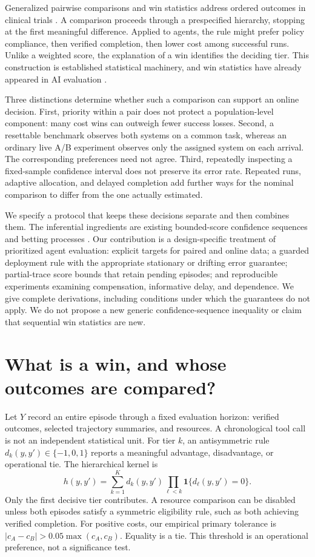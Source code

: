 \documentclass[11pt,letterpaper]{article}
\newcommand{\ind}{\mathbf 1}
\begin{document}
Generalized pairwise comparisons and win statistics address ordered
outcomes in clinical trials \citep{buyse2010generalized,pocock2012win}.
A comparison proceeds through a prespecified hierarchy, stopping at the
first meaningful difference. Applied to agents, the rule might prefer
policy compliance, then verified completion, then lower cost among
successful runs. Unlike a weighted score, the explanation of a win
identifies the deciding tier. This construction is established statistical
machinery, and win statistics have already appeared in AI evaluation
\citep{realpocqi2026}.

Three distinctions determine whether such a comparison can support an
online decision. First, priority within a pair does not protect a
population-level component: many cost wins can outweigh fewer success
losses. Second, a resettable benchmark observes both systems on a common
task, whereas an ordinary live A/B experiment observes only the assigned
system on each arrival. The corresponding preferences need not agree.
Third, repeatedly inspecting a fixed-sample confidence interval does not
preserve its error rate. Repeated runs, adaptive allocation, and delayed
completion add further ways for the nominal comparison to differ from the
one actually estimated.

We specify a protocol that keeps these decisions separate and then
combines them. The inferential ingredients are existing bounded-score
confidence sequences and betting processes
\citep{howard2021confidence,waudbysmith2024betting}. Our contribution is a
design-specific treatment of prioritized agent evaluation: explicit
targets for paired and online data; a guarded deployment rule with the
appropriate stationary or drifting error guarantee; partial-trace score bounds that retain pending episodes; and reproducible
experiments examining compensation, informative delay, and dependence. We give
complete derivations, including conditions under which the guarantees do
not apply. We do not propose a new generic confidence-sequence inequality
or claim that sequential win statistics are new.

\section{What is a win, and whose outcomes are compared?}
\label{sec:estimands}
Let $Y$ record an entire episode through a fixed evaluation horizon:
verified outcomes, selected trajectory summaries, and resources. A
chronological tool call is not an independent statistical unit. For tier
$k$, an antisymmetric rule $d_k(y,y')\in\{-1,0,1\}$ reports a meaningful
advantage, disadvantage, or operational tie. The hierarchical kernel is
\begin{equation}
 h(y,y')=\sum_{k=1}^{K}d_k(y,y')\prod_{\ell<k}
             \ind\{d_\ell(y,y')=0\}.
 \label{eq:main_kernel}
\end{equation}
Only the first decisive tier contributes. A resource comparison can be
disabled unless both episodes satisfy a symmetric eligibility rule, such
as both achieving verified completion. For positive costs, our empirical
primary tolerance is $|c_A-c_B|>0.05\max(c_A,c_B)$. Equality is a tie.
This threshold is an operational preference, not a significance test.
\end{document}
